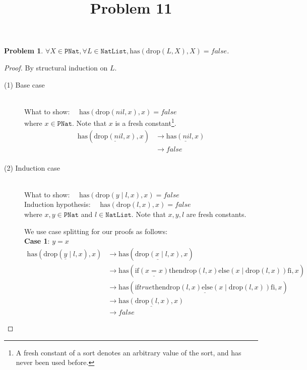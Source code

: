 \documentclass[12pt, a4paper]{article}
\title{Problem 11}
\date{\vspace{-5ex}}
\newtheorem{problem}{Problem}
\newcommand{\rel}[1]{\mathrel{#1}}
\newcommand{\rmx}[1]{\mathrm{#1}}
\newcommand{\larrow}{\longrightarrow}
\newcommand{\under}{\underline}
\begin{document}
\maketitle

\begin{problem}
$\forall X \in \mathtt{PNat}, \forall L \in \mathtt{NatList}, \rmx{has}(\rmx{drop}(L, X), X) = false$.
\end{problem}
\begin{proof}
By structural induction on $L$.

\begin{description}
\item[(1) Base case]~\\
\noindent
What to show: $\quad \rmx{has}(\rmx{drop}(nil, x), x) = false$ \\
where $x \in \mathtt{PNat}$.
Note that $x$ is a fresh constant\footnote{A fresh constant of a sort denotes an arbitrary value of the sort, and has never been used before.}.
\begin{align*}
\rmx{has}(\under{\rmx{drop}(nil, x)}, x)
	&\larrow \under{\rmx{has}(nil, x)} \tag{by drop1} \\
	&\larrow false \tag{by has1} \\
\end{align*}

\item[(2) Induction case]~\\
What to show: $\quad \rmx{has}(\rmx{drop}(y \rel{|} l, x), x) = false$ \\
Induction hypothesis: $\quad \rmx{has}(\rmx{drop}(l, x), x) = false$  \\
where $x, y \in \mathtt{PNat}$ and $l \in \mathtt{NatList}$.
Note that $x, y, l$ are fresh constants.

We use case splitting for our proofs as follows: \\
\textbf{Case 1}: $y = x$
\begin{align*}
\rmx{has}(\rmx{drop}(\under{y} \rel{|} l, x), x)
	&\larrow \rmx{has}(\under{\rmx{drop}(x \rel{|} l, x)}, x) \tag{by case splitting} \\
	&\larrow \rmx{has}(\rel{\rmx{if}} \under{(x = x)} \rel{\rmx{then}} \rmx{drop}(l, x) \rel{\rmx{else}} (x \rel{|} \rmx{drop}(l, x)) \rel{\rmx{fi}}, x) \tag{by drop2} \\	
	&\larrow \rmx{has}(\under{\rel{\rmx{if}} true \rel{\rmx{then}} \rmx{drop}(l, x) \rel{\rmx{else}} (x \rel{|} \rmx{drop}(l, x)) \rel{\rmx{fi}}}, x) \tag{by equality} \\
	&\larrow \under{\rmx{has}(\rmx{drop}(l, x), x)} \tag{by if1} \\
	&\larrow false \tag{by IH}
\end{align*}


\end{description}
\end{proof}
\end{document}
